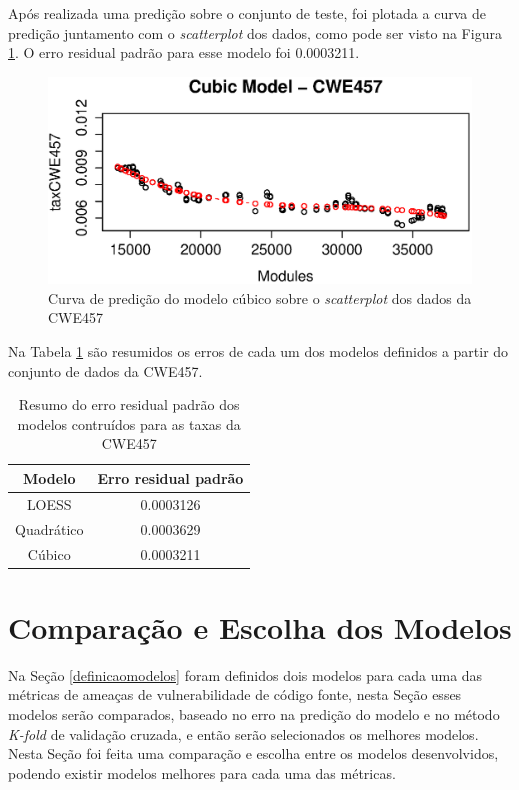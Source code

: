Após realizada uma predição sobre o conjunto de teste, foi plotada a curva de
predição juntamento com o \textit{scatterplot} dos dados, como pode ser visto na
Figura \ref{fig:cwe457-cubic}. O erro residual padrão para esse modelo foi
0.0003211.

\begin{figure}[h]
  \centering
  \includegraphics[width=1.0\textwidth]
      {figuras/cwe457-cubic.eps}
      \caption{Curva de predição do modelo cúbico sobre o \textit{scatterplot}
      dos dados da CWE457}
  \label{fig:cwe457-cubic}
\end{figure}

Na Tabela \ref{tab:cwe457-erros} são resumidos os erros de cada um dos modelos
definidos a partir do conjunto de dados da CWE457.

\begin{table}[h]
 \centering
 \begin{tabular}{cc}
  \hline
  \rowcolor[HTML]{EFEFEF} 
  {Modelo} & {Erro residual padrão} \\ \hline
  {LOESS}  & 0.0003126                  \\ \hline
  Quadrático   & 0.0003629                  \\ \hline
  Cúbico       & 0.0003211                \\ \hline 
 \end{tabular}
 \caption{Resumo do erro residual padrão dos modelos contruídos para as taxas da
 CWE457}
 \label{tab:cwe457-erros}
\end{table}




\section{Comparação e Escolha dos Modelos}\label{comparacaomodelos}

Na Seção \ref{definicaomodelos} foram definidos dois modelos para cada uma das
métricas de ameaças de vulnerabilidade de código fonte, nesta Seção esses
modelos serão comparados, baseado no erro na predição do modelo e no método
\textit{K-fold} de validação cruzada, e então serão selecionados os melhores
modelos. Nesta Seção foi feita uma comparação e escolha entre os modelos
desenvolvidos, podendo existir modelos melhores para cada uma das métricas.

